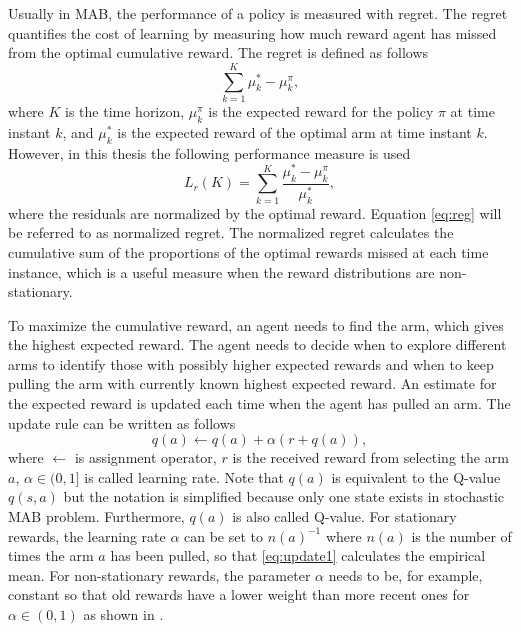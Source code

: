 \documentclass[english, 12pt, a4paper, elec, utf8, a-1b, online]{aaltothesis}
\numberwithin{equation}{section}
\newcommand{\regret}{L_r}
\begin{document}
Usually in MAB, the performance of a policy is measured with regret.
The regret quantifies the cost of learning by measuring how much reward agent has missed from the optimal cumulative reward.
The regret is defined as follows
\begin{equation*}
    \sum_{k=1}^K \mu^*_k - \mu^\pi_k,
\end{equation*}
where $K$ is the time horizon, $\mu^\pi_k$ is the expected reward for the policy $\pi$ at time instant $k$, and $\mu_k^*$ is the expected reward of the optimal arm at time instant $k$.
However, in this thesis the following performance measure is used
\begin{equation}\label{eq:reg}
    \regret(K) = \sum_{k=1}^K \frac{\mu^*_k - \mu^\pi_k}{\mu^*_k},
\end{equation}
where the residuals are normalized by the optimal reward.
Equation \eqref{eq:reg} will be referred to as normalized regret.
The normalized regret calculates the cumulative sum of the proportions of the optimal rewards missed at each time instance, which is a useful measure when the reward distributions are non-stationary.

To maximize the cumulative reward, an agent needs to find the arm, which gives the highest expected reward.
The agent needs to decide when to explore different arms to identify those with possibly higher expected rewards and when to keep pulling the arm with currently known highest expected reward.
An estimate for the expected reward is updated each time when the agent has pulled an arm.
The update rule can be written as follows
\begin{equation}\label{eq:update1}
    q(a) \leftarrow q(a) + \alpha \left(r + q(a)\right),
\end{equation}
where $\leftarrow$ is assignment operator, $r$ is the received reward from selecting the arm $a$, $\alpha \in (0, 1]$ is called learning rate.
Note that $q(a)$ is equivalent to the Q-value $q(s, a)$ but the notation is simplified because only one state exists in stochastic MAB problem.
Furthermore, $q(a)$ is also called Q-value.
For stationary rewards, the learning rate $\alpha$ can be set to $n(a)^{-1}$ where $n(a)$ is the number of times the arm $a$ has been pulled, so that \eqref{eq:update1} calculates the empirical mean. 
For non-stationary rewards, the parameter $\alpha$ needs to be, for example, constant so that old rewards have a lower weight than more recent ones for $\alpha \in (0, 1)$ as shown in \cite{Sutton2018}.
\end{document}
